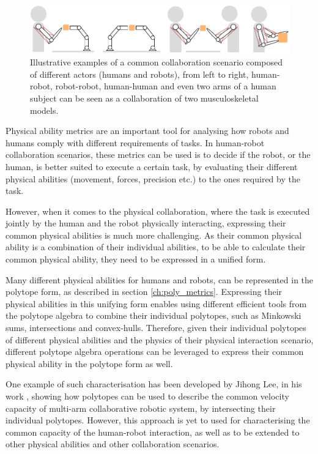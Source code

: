 \begin{figure}[!h]
    \centering
    \includegraphics[width=\linewidth]{Chapters/imgs/collaboration.pdf}
    \caption{Illustrative examples of a common collaboration scenario composed of different actors (humans and robots), from left to right, human-robot, robot-robot, human-human and even two arms of a human subject can be seen as a collaboration of two musculoskeletal models.}
    \label{fig:collaboration_types}
\end{figure}

Physical ability metrics are an important tool for analysing how robots and humans comply with different requirements of tasks. In human-robot collaboration scenarios, these metrics can be used is to decide if the robot, or the human, is better suited to execute a certain task, by evaluating their different physical abilities (movement, forces, precision etc.) to the ones required by the task\cite{Edoardo2019Capability}. 

However, when it comes to the physical collaboration, where the task is executed jointly by the human and the robot physically interacting, expressing their common physical abilities is much more challenging. As their common physical ability is a combination of their individual abilities, to be able to calculate their common physical ability, they need to be expressed in a unified form.  

Many different physical abilities for humans and robots, can be represented in the polytope form, as described in section \ref{ch:poly_metrics}. Expressing their physical abilities in this unifying form enables using different efficient tools from the polytope algebra to combine their individual polytopes, such as Minkowski sums, intersections and convex-hulls.
Therefore, given their individual polytopes of different physical abilities and the physics of their physical interaction scenario, different polytope algebra operations can be leveraged to express their common physical ability in the polytope form as well.

One example of such characterisation has been developed by Jihong Lee, in his work \cite{lee2001velocity}, showing how polytopes can be used to describe the common velocity capacity of multi-arm collaborative robotic system, by intersecting their individual polytopes. However, this approach is yet to used for characterising the common capacity of the human-robot interaction, as well as to be extended to other physical abilities and other collaboration scenarios. 



